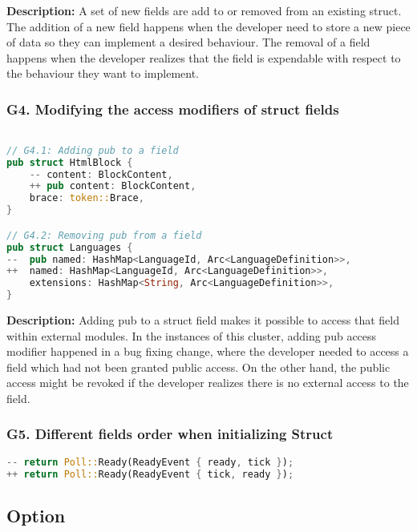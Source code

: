 \documentclass{article}
\begin{document}
\noindent \textbf{Description:} A set of new fields are add to or removed from an existing struct. The addition of a new field happens when the developer need to store a new piece of data so they can implement a desired behaviour. The removal of a field  happens when the developer realizes that the field is expendable with respect to the behaviour they want to implement.

\subsubsection{G4. Modifying the access modifiers of struct fields}

\begin{lstlisting}[language=Rust, style=colouredRust, label={l3}]

// G4.1: Adding pub to a field
pub struct HtmlBlock {
    -- content: BlockContent,
    ++ pub content: BlockContent,
    brace: token::Brace,
} 

// G4.2: Removing pub from a field
pub struct Languages {
--  pub named: HashMap<LanguageId, Arc<LanguageDefinition>>,
++  named: HashMap<LanguageId, Arc<LanguageDefinition>>,
    extensions: HashMap<String, Arc<LanguageDefinition>>,
}

\end{lstlisting}

\noindent \textbf{Description:} Adding pub to a struct field makes it possible to access that field within external modules. In the instances of this cluster, adding pub access modifier happened in a bug fixing change, where the developer needed to access a field which had not been granted public access. On the other hand, the public access might be revoked if the developer realizes there is no external access to the field.

\subsubsection{G5. Different fields order when initializing Struct}



\begin{lstlisting}[language=Rust, style=colouredRust, label={l3}]
-- return Poll::Ready(ReadyEvent { ready, tick });
++ return Poll::Ready(ReadyEvent { tick, ready });
\end{lstlisting}

\subsection{Option}
\end{document}
